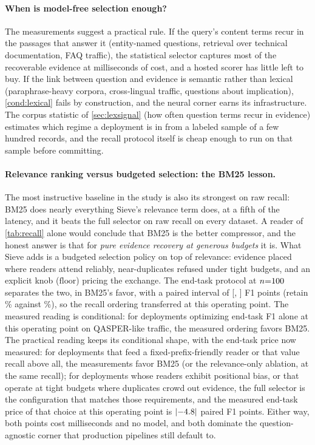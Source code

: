 \documentclass[preprint,12pt]{elsarticle}
\DeclarePairedDelimiter\abs{\lvert}{\rvert}
\theoremstyle{remark}
\newcommand{\method}{Sieve}
\begin{document}
\paragraph{When is model-free selection enough?}
The measurements suggest a practical rule. If the query's content
terms recur in the passages that answer it (entity-named questions,
retrieval over technical documentation, FAQ traffic), the statistical
selector captures most of the recoverable evidence at milliseconds of
cost, and a hosted scorer has little left to buy. If the link between
question and evidence is semantic rather than lexical
(paraphrase-heavy corpora, cross-lingual traffic, questions about
implication), \autoref{cond:lexical} fails by construction, and the
neural corner earns its infrastructure. The corpus statistic of
\autoref{sec:lexsignal} (how often question terms recur in evidence)
estimates which regime a deployment is in from a labeled sample of a
few hundred records, and the recall protocol itself is cheap enough
to run on that sample before committing.

\paragraph{Relevance ranking versus budgeted selection: the BM25
lesson.}
The most instructive baseline in the study is also its strongest on
raw recall: BM25
does nearly everything \method{}'s relevance term does, at a fifth of
the latency, and it beats the full selector on raw recall on every
dataset. A reader of \autoref{tab:recall} alone would conclude that
BM25 is the better compressor, and the honest answer is that for
\emph{pure evidence recovery at generous budgets} it is. What
\method{} adds is a budgeted selection policy on top of relevance:
evidence placed where readers attend reliably, near-duplicates
refused under tight budgets, and an explicit knob
($\mathrm{floor}$) pricing the exchange. The end-task protocol at
$n{=}100$ separates the two, in BM25's favor, with a paired interval
of [\QAPairSBmLo, \QAPairSBmHi] F1 points (retain \QABmRetain\% against
\QASieRetain\%), so the recall ordering transferred at this operating
point. The measured reading is conditional: for deployments
optimizing end-task F1 alone at this operating point on
QASPER-like traffic, the measured ordering favors BM25. The
practical reading keeps its conditional shape, with the end-task price
now measured: for deployments that feed a
fixed-prefix-friendly reader or that value
recall above all, the measurements favor BM25 (or the relevance-only
ablation, at
the same recall); for deployments whose readers exhibit positional
bias,
or that operate at tight budgets where duplicates crowd out evidence,
the full selector is the configuration that matches those
requirements, and the measured end-task price of that choice at this
operating point is $\abs{\QAPairSBm}$ paired F1
points. Either way, both points cost
milliseconds and no model, and both dominate the question-agnostic
corner that production pipelines still default to.
\end{document}
